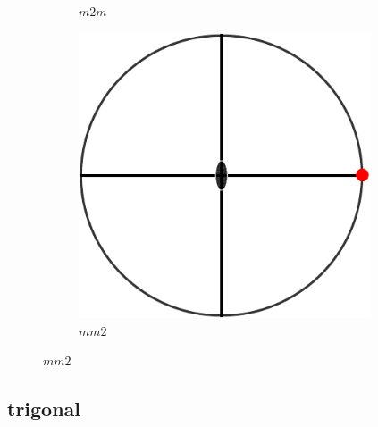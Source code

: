 \documentclass[compress]{beamer}
\begin{document}
\begin{frame}[fragile]
\begin{figure}[H]
\begin{subfigure}{0.3\textwidth}
      \caption{$m2m$}
    \end{subfigure}
    \begin{subfigure}{0.3\textwidth}
      \centering
      \includegraphics[width=0.95\textwidth]{pic/mm2}
      \caption{$mm2$}
    \end{subfigure}
  \end{figure}

\end{frame}

\subsection*{trigonal}
\end{document}
